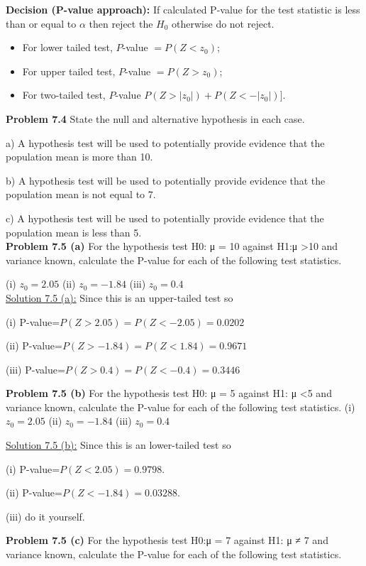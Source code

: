 \documentclass[
  11pt,
  letterpaper,
  DIV=11,
  numbers=noendperiod]{scrreprt}
\begin{document}
\textbf{Decision (P-value approach):} If calculated P-value for the test
statistic is less than or equal to \(\alpha\) then reject the \(H_0\)
otherwise do not reject.

\begin{itemize}
\item
  For lower tailed test, \(P\)-value \(=P(Z<z_0)\);
\item
  For upper tailed test, \(P\)-value \(=P(Z>z_0)\);
\item
  For two-tailed test, \(P\)-value \(P(Z>|z_0|)+P(Z<-|z_0|)]\).
\end{itemize}

\textbf{Problem 7.4} State the null and alternative hypothesis in each
case.

a) A hypothesis test will be used to potentially provide evidence that
the population mean is more than 10.

b) A hypothesis test will be used to potentially provide evidence that
the population mean is not equal to 7.

c) A hypothesis test will be used to potentially provide evidence that
the population mean is less than 5.\\

\textbf{Problem 7.5 (a)} For the hypothesis test H0: μ = 10 against H1:μ
\textgreater10 and variance known, calculate the P-value for each of the
following test statistics.

(i) \(z_0 = 2.05\) (ii) \(z_0 = - 1.84\) (iii) \(z_0 = 0.4\)\\

\ul{Solution 7.5 (a):} Since this is an upper-tailed test so

(i) P-value=\(P(Z>2.05)=P(Z<-2.05)=0.0202\)

(ii) P-value=\(P(Z>-1.84)=P(Z<1.84)=0.9671\)

(iii) P-value=\(P(Z>0.4)=P(Z<-0.4)=0.3446\)

\textbf{Problem 7.5 (b)} For the hypothesis test H0: μ = 5 against H1: μ
\textless5 and variance known, calculate the P-value for each of the
following test statistics. (i) \(z_0 = 2.05\) (ii) \(z_0 = - 1.84\)
(iii) \(z_0 = 0.4\)

\ul{Solution 7.5 (b):} Since this is an lower-tailed test so

(i) P-value=\(P(Z<2.05)=0.9798\).

(ii) P-value=\(P(Z<-1.84)=0.03288\).

(iii) do it yourself.

\textbf{Problem 7.5 (c)} For the hypothesis test H0:μ = 7 against H1: μ
≠ 7 and variance known, calculate the P-value for each of the following
test statistics.
\end{document}
